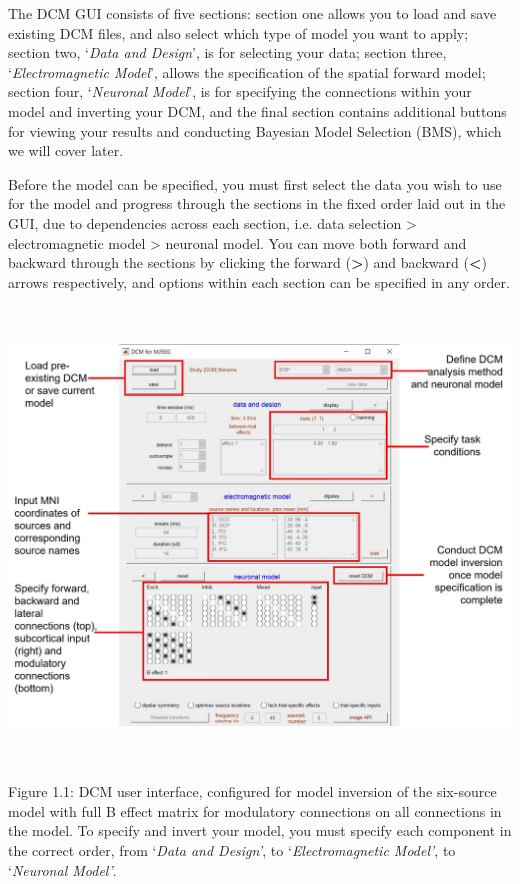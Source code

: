 The DCM GUI consists of five sections: section one allows you to load
and save existing DCM files, and also select which type of model you
want to apply; section two, `\emph{Data and Design}', is for selecting
your data; section three, `\emph{Electromagnetic Model}', allows the
specification of the spatial forward model; section four,
`\emph{Neuronal Model}', is for specifying the connections within your
model and inverting your DCM, and the final section contains additional
buttons for viewing your results and conducting Bayesian Model Selection
(BMS), which we will cover later.

Before the model can be specified, you must first select the data you
wish to use for the model and progress through the sections in the fixed
order laid out in the GUI, due to dependencies across each section, i.e.
data selection \textgreater{} electromagnetic model \textgreater{}
neuronal model. You can move both forward and backward through the
sections by clicking the forward (\textbf{\textgreater{}}) and backward
(\textbf{\textless{}}) arrows respectively, and options within each
section can be specified in any order.

\includegraphics[width=6.26806in,height=4.76458in]{DCM_user_interface.png}

Figure 1.1: DCM user interface, configured for model inversion of the
six-source model with full B effect matrix for modulatory connections on
all connections in the model. To specify and invert your model, you must
specify each component in the correct order, from `\emph{Data and
Design'}, to `\emph{Electromagnetic Model'}, to `\emph{Neuronal Model'}.

